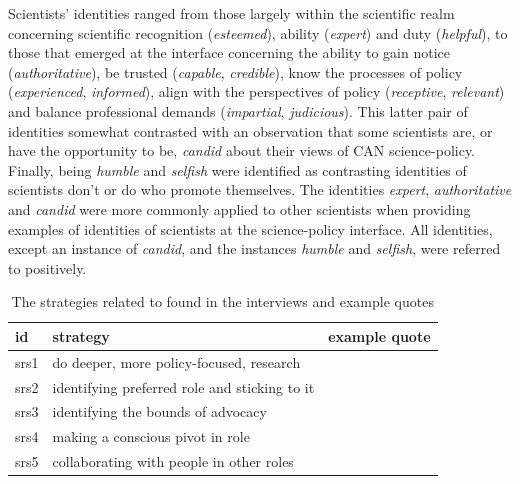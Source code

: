 Scientists' identities ranged from those largely within the scientific realm concerning scientific recognition (\emph{esteemed}), ability (\emph{expert}) and duty (\emph{helpful}), to those that emerged at the interface concerning the ability to gain notice (\emph{authoritative}), be trusted (\emph{capable}, \emph{credible}), know the processes of policy (\emph{experienced}, \emph{informed}), align with the perspectives of policy (\emph{receptive}, \emph{relevant}) and balance professional demands (\emph{impartial}, \emph{judicious}). This latter pair of identities somewhat contrasted with an observation that some scientists are, or have the opportunity to be, \emph{candid} about their views of CAN science-policy. Finally, being \emph{humble} and \emph{selfish} were identified as contrasting identities of scientists don't or do who promote themselves. The identities \emph{expert}, \emph{authoritative} and \emph{candid} were more commonly applied to other scientists when providing examples of identities of scientists at the science-policy interface. All identities, except an instance of \emph{candid}, and the instances \emph{humble} and \emph{selfish}, were referred to positively.

\begin{table}[!ht]
\footnotesize
\caption{The strategies related to \ismsr{} found in the interviews and example quotes}\label{tab:resrolesstrat}
\begin{tabular}{L{.06\linewidth}L{.3\linewidth}L{.64\linewidth}} \hline
\textbf{id} & \textbf{strategy} & \textbf{example quote} \\ \hline \hline
srs1 & do deeper, more policy-focused, research &  \\[5mm]
srs2 & identifying preferred role and sticking to it &  \\[5mm]
srs3 & identifying the bounds of advocacy &  \\[5mm]
srs4 & making a conscious pivot in role &  \\[5mm]
srs5 & collaborating with people in other roles & \\[5mm] \hline
\end{tabular}
\end{table}

